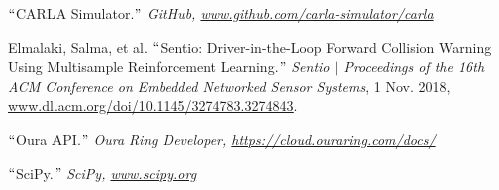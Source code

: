 \documentclass[12pt]{article}
\renewcommand{\_}{\kern-1.5pt\textunderscore\kern-1.5pt}
\begin{document}
$``$CARLA Simulator.$"$  \textit{GitHub, \href{http://www.github.com/carla-simulator/carla}{}\textcolor[HTML]{1155CC}{\ul{www.github.com/carla-simulator/carla}}}\par

Elmalaki, Salma, et al. $``$Sentio: Driver-in-the-Loop Forward Collision Warning Using Multisample Reinforcement Learning.$"$  \textit{Sentio $ \vert $  Proceedings of the 16th ACM Conference on Embedded Networked Sensor Systems}, 1 Nov. 2018, \href{http://www.dl.acm.org/doi/10.1145/3274783.3274843}{\textcolor[HTML]{1155CC}{\ul{www.dl.acm.org/doi/10.1145/3274783.3274843}}}.\par

$``$Oura API.$"$  \textit{Oura Ring Developer, \href{https://cloud.ouraring.com/docs/}{}\textcolor[HTML]{1155CC}{\ul{https://cloud.ouraring.com/docs/}}}\par

$``$SciPy.$"$  \textit{SciPy, \href{http://www.scipy.org}{}\textcolor[HTML]{1155CC}{\ul{www.scipy.org}}}\par


\vspace{\baselineskip}

\vspace{\baselineskip}

\vspace{\baselineskip}

\vspace{\baselineskip}

\vspace{\baselineskip}

\vspace{\baselineskip}

\vspace{\baselineskip}

\vspace{\baselineskip}

\vspace{\baselineskip}

\vspace{\baselineskip}

\vspace{\baselineskip}

\vspace{\baselineskip}

\vspace{\baselineskip}

\vspace{\baselineskip}

\printbibliography
\end{document}
